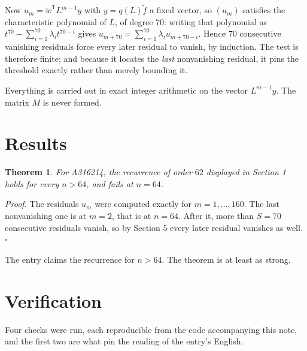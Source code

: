 \documentclass[11pt]{article}
\newtheorem{theorem}{Theorem}
\theoremstyle{definition}
\begin{document}
Now $u_m = \tilde w^{\mathsf T} L^{m-1} y$ with $y = q(L)\tilde f$ a fixed vector, so $(u_m)$ satisfies the characteristic polynomial of $L$, of degree $70$: writing that polynomial as $t^{70} - \sum_{i=1}^{70} \lambda_i t^{70-i}$ gives $u_{m+70} = \sum_{i=1}^{70} \lambda_i u_{m+70-i}$. Hence $70$ consecutive vanishing residuals force every later residual to vanish, by induction. The test is therefore finite; and because it locates the {\itshape last} nonvanishing residual, it pins the threshold exactly rather than merely bounding it.

Everything is carried out in exact integer arithmetic on the vector $L^{m-1}y$. The matrix $M$ is never formed.

\section{Results}

\begin{theorem} For A316214, the recurrence of order $62$ displayed in Section 1 holds for every $n > 64$, and fails at $n = 64$.\end{theorem}

{\itshape Proof.} The residuals $u_m$ were computed exactly for $m = 1,\dots,160$. The last nonvanishing one is at $m = 2$, that is at $n = 64$. After it, more than $S = 70$ consecutive residuals vanish, so by Section 5 every later residual vanishes as well. $\square$

The entry claims the recurrence for $n > 64$. The theorem is at least as strong.

\section{Verification}

Four checks were run, each reproducible from the code accompanying this note, and the first two are what pin the reading of the entry's English.
\end{document}
